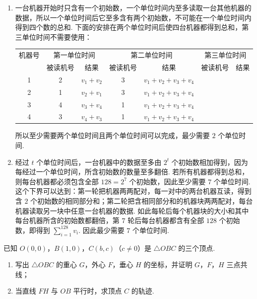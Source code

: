 \begin{solution}
\begin{enumerate}
\item 一台机器开始时只含有一个初始数，一个单位时间内至多读取一台其他机器的数据，所以一个单位时间后它至多含有两个初始数，不可能在一个单位时间内得到四个数的总和. 下面的安排在两个单位时间后使四台机器都得到总和，第三单位时间不需要使用：
\begin{center}
\begin{tabular}{c|cc|cc|cc}
机器号 & \multicolumn{2}{c|}{第一单位时间} & \multicolumn{2}{c|}{第二单位时间} & \multicolumn{2}{c}{第三单位时间}\\
 & 被读机号 & 结果 & 被读机号 & 结果 & 被读机号 & 结果\\
1 & 2 & \(v_1+v_2\) & 3 & \(v_1+v_2+v_3+v_4\) & &\\
2 & 1 & \(v_2+v_1\) & 3 & \(v_1+v_2+v_3+v_4\) & &\\
3 & 4 & \(v_3+v_4\) & 1 & \(v_1+v_2+v_3+v_4\) & &\\
4 & 3 & \(v_4+v_3\) & 1 & \(v_1+v_2+v_3+v_4\) & &
\end{tabular}
\end{center}
所以至少需要两个单位时间且两个单位时间可以完成，最少需要 \(2\) 个单位时间.
\item 经过 \(t\) 个单位时间后，一台机器中的数据至多由 \(2^t\) 个初始数相加得到，因为每经过一个单位时间，所含初始数的数量至多翻倍. 若所有机器都得到总和，则每台机器都必须包含全部 \(128=2^7\) 个初始数，因此至少需要 \(7\) 个单位时间. 这个下界可以达到：第一轮把机器两两配对，每一对中的两台机器互读，得到含 \(2\) 个初始数的相同部分和；第二轮把含相同部分和的机器块两两配对，每台机器读取另一块中任意一台机器的数据. 如此每轮后每个机器块的大小和其中每台机器所含的初始数都翻倍，第 \(7\) 轮后每台机器都含有全部 \(128\) 个初始数，即得到 \(\sum_{i=1}^{128}v_i\). 因此最少需要 \(7\) 个单位时间.
\end{enumerate}
\end{solution}

\begin{problem}
已知 \(O(0,0)\)，\(B(1,0)\)，\(C(b,c)\)（\(c\ne0\)）是 \(\triangle OBC\) 的三个顶点.

\begin{enumerate}
\item 写出 \(\triangle OBC\) 的重心 \(G\)，外心 \(F\)，垂心 \(H\) 的坐标，并证明 \(G\)，\(F\)，\(H\) 三点共线；
\item 当直线 \(FH\) 与 \(OB\) 平行时，求顶点 \(C\) 的轨迹.
\end{enumerate}
\end{problem}

